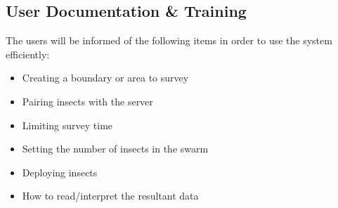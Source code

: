 \documentclass[11pt]{article}
\begin{document}
\subsection{User Documentation \& Training}
The users will be informed of the following items in order to use the system efficiently:
\begin{itemize}
    \item Creating a boundary or area to survey
    \item Pairing insects with the server
    \item Limiting survey time
    \item Setting the number of insects in the swarm
    \item Deploying insects 
    \item How to read/interpret the resultant data
\end{itemize}
\end{document}
